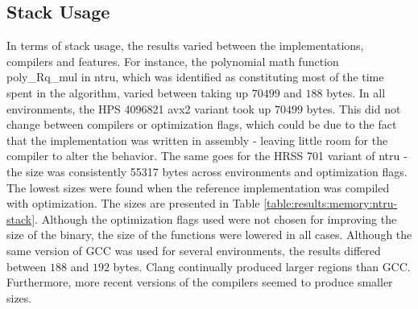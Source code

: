 \subsection{Stack Usage}

In terms of stack usage, the results varied between the implementations, compilers and features. For instance, the polynomial math function poly\_Rq\_mul in \gls{ntru}, which was identified as constituting most of the time spent in the algorithm, varied between taking up $70499$ and $188$ bytes. In all environments, the HPS 4096821 \gls{avx2} variant took up $70499$ bytes. This did not change between compilers or optimization flags, which could be due to the fact that the implementation was written in assembly - leaving little room for the compiler to alter the behavior. The same goes for the HRSS 701 variant of \gls{ntru} - the size was consistently 55317 bytes across environments and optimization flags. The lowest sizes were found when the reference implementation was compiled with optimization. The sizes are presented in Table \ref{table:results:memory:ntru-stack}. Although the optimization flags used were not chosen for improving the size of the binary, the size of the functions were lowered in all cases. Although the same version of GCC was used for several environments, the results differed between $188$ and $192$ bytes. Clang continually produced larger regions than GCC. Furthermore, more recent versions of the compilers seemed to produce smaller sizes.

